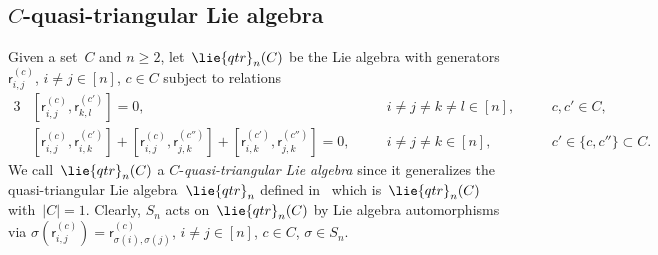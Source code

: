 \documentclass[12pt, reqno]{amsart}
\theoremstyle{definition}
\numberwithin{equation}{section}
\newcommand{\sr}[3]{\mathsf r_{#1,#2}^{(#3)}}
\begin{document}
\subsection{\texorpdfstring{$C$}{C}-quasi-triangular Lie algebra}\label{subs:Cqtr}
Given a set~$C$ and $n\ge 2$, let~$\lie{qtr}_n(C)$ be the Lie algebra with generators $\mathsf r_{i,j}^{(c)}$,
$i\not=j\in [n]$, $c\in C$ subject to relations 
\begin{alignat}{3}
&[\sr{i}{j}{c},\sr{k}{l}{c'}]=0,\label{eq:CYB rels comm}
&&i\not=j\not=k\not=l\in[n],&\quad &c,c'\in C,\\
\label{eq:CYB rels}
&[\sr ij{c},\sr ik{c'}]+[\sr ijc,\sr jk{c''}]+[\sr ik{c'},\sr jk{c''}]=0,&\quad &
i\not=j\not=k\in [n],&&c'\in\{c,c''\}\subset C.
\end{alignat}
We call~$\lie{qtr}_n(C)$ a $C$-{\em quasi-triangular Lie algebra} since 
it generalizes the quasi-triangular Lie algebra~$\lie{qtr}_n$ defined in~\cite{BEER} which
is~$\lie{qtr}_n(C)$ with~$|C|=1$. Clearly, $S_n$ acts 
on~$\lie{qtr}_n(C)$ by Lie algebra automorphisms via
$\sigma(\sr ijc)=\sr{\sigma(i)}{\sigma(j)}{c}$, $i\not=j\in[n]$, $c\in C$, $\sigma\in S_n$.
\end{document}
